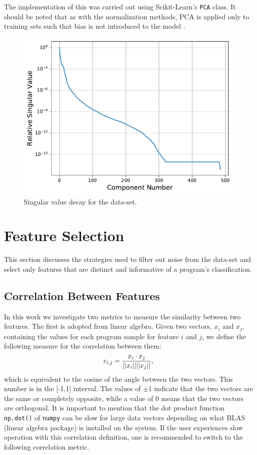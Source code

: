 \documentclass[paper=a4, fontsize=11pt]{scrartcl} %
\begin{document}
The implementation of this was carried out using Scikit-Learn's \verb|PCA| class.
It should be noted that as with the normalization methods, PCA is applied only to training sets such that bias is not introduced to the model \cite{scikit-learn} \cite{pcaWiki} \cite{pcaTDS}. 
\begin{figure}[H]
	\centering
	\includegraphics[scale=0.6]{figures/pca.pdf}
	\caption{Singular value decay for the data-set.}
	\label{fig: decomposition}
\end{figure}


\section{Feature Selection} \label{sec: features}

This section discusses the strategies used to filter out noise from the data-set and select only features that are distinct and informative of a program's classification.

\subsection*{Correlation Between Features}

In this work we investigate two metrics to measure the similarity between two features.
The first is adopted from linear algebra. 
Given two vectors, $x_i$ and $x_j$, containing the values for each program sample for feature $i$ and $j$, we define the following measure for the  correlation between them:
\begin{equation}
\small
c_{i,j}=\frac{x_i \cdot x_j}{||x_i||||x_j||},
\end{equation}
which is equivalent to the cosine of the angle between the two vectors.
This number is in the [-1,1] interval. 
The values of $\pm$1 indicate that the two vectors are the same or completely opposite, while a value of 0 means that the two vectors are orthogonal.
It is important to mention that the dot product function \texttt{np.dot()} of \texttt{numpy} can be slow for large data vectors depending on what BLAS (linear algebra package) is installed on the system.
If the user experiences slow operation with this correlation definition, one is recommended to switch to the following correlation metric.  
\end{document}
